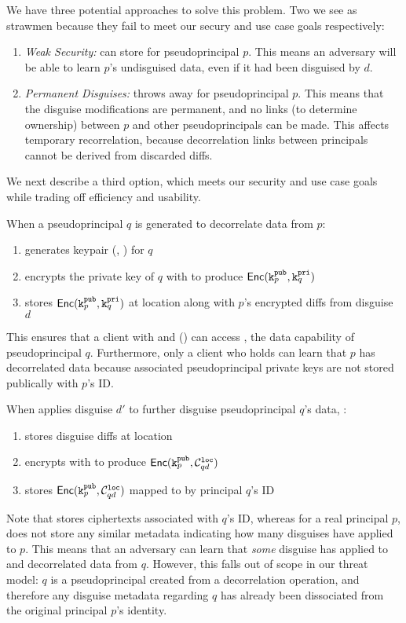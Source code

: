 We have three potential approaches to solve this problem. Two we see as strawmen because they fail
to meet our secury and use case goals respectively:
\begin{enumerate}
    \item \emph{Weak Security:} \sys can store  for pseudoprincipal $p$. This means
        an adversary will be able to learn $p$'s undisguised data, even if it had been disguised by
        $d$.

    \item \emph{Permanent Disguises:} \sys throws away  for pseudoprincipal $p$. This means that the
        disguise modifications are permanent, and no links (to determine ownership) between
        $p$ and other pseudoprincipals can be made. This affects temporary recorrelation, because
        decorrelation links between principals cannot be derived from discarded diffs.
\end{enumerate}

We next describe a third option, which meets our security and use case goals while trading off
efficiency and usability.

When a pseudoprincipal $q$ is generated to decorrelate data from $p$: 
\begin{enumerate}
    \item \sys generates keypair (, ) for $q$
    \item encrypts the private key of $q$ with  to produce $\mathsf{Enc}(\texttt{\ensuremath{\texttt{k}^{\text{pub}}_{p}}}, \texttt{\ensuremath{\texttt{k}^{\text{pri}}_{q}}})$
    \item stores $\mathsf{Enc}(\texttt{\ensuremath{\texttt{k}^{\text{pub}}_{p}}}, \texttt{\ensuremath{\texttt{k}^{\text{pri}}_{q}}})$ at location  along with $p$'s encrypted diffs from disguise $d$
\end{enumerate}
This ensures that a client with  and  () can access , the data
capability of pseudoprincipal $q$.  Furthermore, only a client who holds  can learn
that $p$ has decorrelated data because associated pseudoprincipal private keys are not stored
publically with $p$'s ID.

When \sys applies disguise $d'$ to further disguise pseudoprincipal $q$'s data, \sys:
\begin{enumerate}
    \item stores disguise diffs  at location 
    \item encrypts  with  to produce $\mathsf{Enc}(\texttt{\ensuremath{\texttt{k}^{\text{pub}}_{p}}}, \mathcal{C}^{\texttt{loc}}_{qd})$
    \item stores $\mathsf{Enc}(\texttt{\ensuremath{\texttt{k}^{\text{pub}}_{p}}}, \mathcal{C}^{\texttt{loc}}_{qd})$ mapped to by principal $q$'s ID
\end{enumerate}
Note that \sys stores  ciphertexts associated with $q$'s ID, whereas for a real principal
$p$, \sys does not store any similar metadata indicating how many disguises have applied to $p$. 
This means that an adversary can learn that \emph{some} disguise has applied to and
decorrelated data from $q$. However, this falls out of scope in our threat model: $q$ is a
pseudoprincipal created from a decorrelation operation, and therefore any disguise metadata regarding $q$ has already been dissociated from
the original principal $p$'s identity.  

